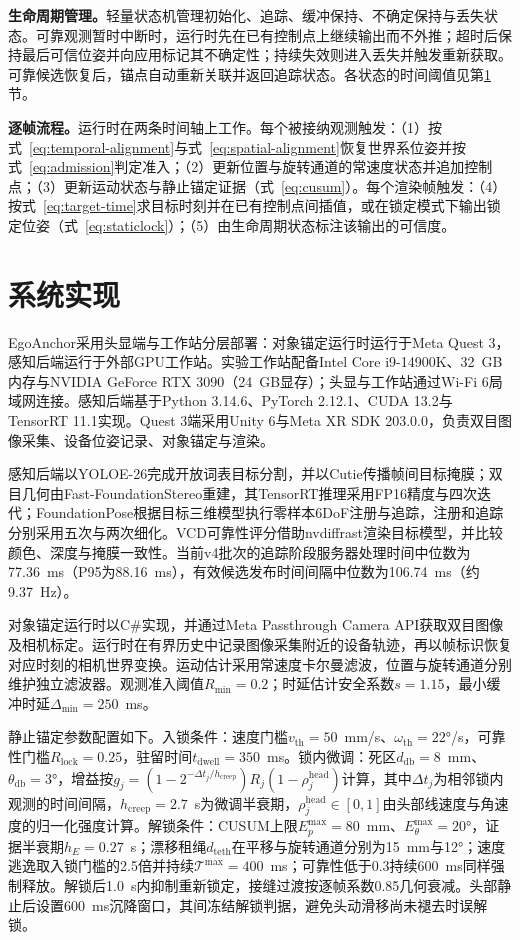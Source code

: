 \documentclass[review]{vgtc}
\begin{document}
\textbf{生命周期管理。}轻量状态机管理初始化、追踪、缓冲保持、不确定保持与丢失状态。可靠观测暂时中断时，运行时先在已有控制点上继续输出而不外推；超时后保持最后可信位姿并向应用标记其不确定性；持续失效则进入丢失并触发重新获取。可靠候选恢复后，锚点自动重新关联并返回追踪状态。各状态的时间阈值见第\ref{sec:implementation}节。

\textbf{逐帧流程。}运行时在两条时间轴上工作。每个被接纳观测触发：（1）按式~\eqref{eq:temporal-alignment}与式~\eqref{eq:spatial-alignment}恢复世界系位姿并按式~\eqref{eq:admission}判定准入；（2）更新位置与旋转通道的常速度状态并追加控制点；（3）更新运动状态与静止锚定证据（式~\eqref{eq:cusum}）。每个渲染帧触发：（4）按式~\eqref{eq:target-time}求目标时刻并在已有控制点间插值，或在锁定模式下输出锁定位姿（式~\eqref{eq:staticlock}）；（5）由生命周期状态标注该输出的可信度。

\section{系统实现}\label{sec:implementation}

EgoAnchor采用头显端与工作站分层部署：对象锚定运行时运行于Meta Quest 3，感知后端运行于外部GPU工作站。实验工作站配备Intel Core i9-14900K、32~GB内存与NVIDIA GeForce RTX 3090（24~GB显存）；头显与工作站通过Wi-Fi 6局域网连接。感知后端基于Python 3.14.6、PyTorch 2.12.1、CUDA 13.2与TensorRT 11.1实现。Quest 3端采用Unity 6与Meta XR SDK 203.0.0，负责双目图像采集、设备位姿记录、对象锚定与渲染。

感知后端以YOLOE-26完成开放词表目标分割，并以Cutie传播帧间目标掩膜；双目几何由Fast-FoundationStereo重建，其TensorRT推理采用FP16精度与四次迭代；FoundationPose根据目标三维模型执行零样本6DoF注册与追踪，注册和追踪分别采用五次与两次细化。VCD可靠性评分借助nvdiffrast渲染目标模型，并比较颜色、深度与掩膜一致性。当前v4批次的追踪阶段服务器处理时间中位数为77.36~ms（P95为88.16~ms），有效候选发布时间间隔中位数为106.74~ms（约9.37~Hz）。

对象锚定运行时以C\#实现，并通过Meta Passthrough Camera API获取双目图像及相机标定。运行时在有界历史中记录图像采集附近的设备轨迹，再以帧标识恢复对应时刻的相机世界变换。运动估计采用常速度卡尔曼滤波，位置与旋转通道分别维护独立滤波器。观测准入阈值$R_{\min} = 0.2$；时延估计安全系数$s = 1.15$，最小缓冲时延$\Delta_{\min} = 250$~ms。

静止锚定参数配置如下。入锁条件：速度门槛$v_{\mathrm{th}} = 50$~mm/s、$\omega_{\mathrm{th}} = 22$°/s，可靠性门槛$R_{\mathrm{lock}} = 0.25$，驻留时间$t_{\mathrm{dwell}} = 350$~ms。锁内微调：死区$d_{\mathrm{db}} = 8$~mm、$\theta_{\mathrm{db}} = 3$°，增益按$g_j = (1 - 2^{-\Delta t_j / h_{\mathrm{creep}}}) R_j (1 - \rho_j^{\mathrm{head}})$计算，其中$\Delta t_j$为相邻锁内观测的时间间隔，$h_{\mathrm{creep}} = 2.7$~s为微调半衰期，$\rho_j^{\mathrm{head}} \in [0,1]$由头部线速度与角速度的归一化强度计算。解锁条件：CUSUM上限$E_p^{\max} = 80$~mm、$E_\theta^{\max} = 20$°，证据半衰期$h_E = 0.27$~s；漂移租绳$d_{\mathrm{teth}}$在平移与旋转通道分别为15~mm与12°；速度逃逸取入锁门槛的2.5倍并持续$\mathcal{T}^{\max} = 400$~ms；可靠性低于0.3持续600~ms同样强制释放。解锁后1.0~s内抑制重新锁定，接缝过渡按逐帧系数0.85几何衰减。头部静止后设置600~ms沉降窗口，其间冻结解锁判据，避免头动滑移尚未褪去时误解锁。
\end{document}
